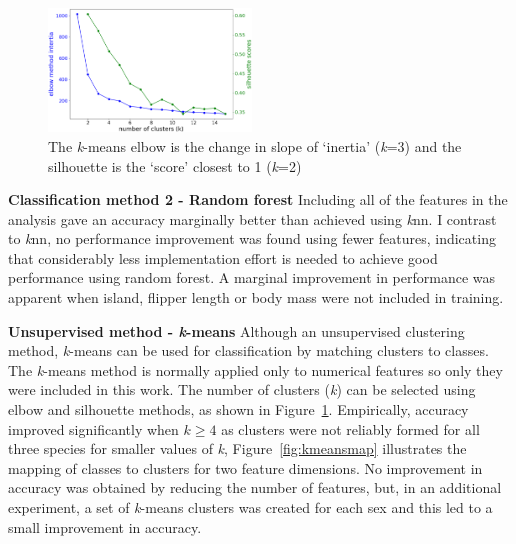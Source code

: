 \documentclass[12pt]{article}
\begin{document}
\begin{figure} %
  \centering
  \vspace{-2\baselineskip} %
  \includegraphics[width=0.48\textwidth]{kmeansvalue.png} %
  \vspace{-1.5\baselineskip} %
  \caption{The \textit{k}-means elbow is the change in slope of `inertia' (\textit{k}=3)
  and the silhouette is the `score' closest to 1 (\textit{k}=2)}
  \vspace{-0.5\baselineskip} %
  \label{fig:kmeansvalue}
\end{figure}

\textbf{Classification method 2 - Random forest}  
Including all of the features in the analysis gave an accuracy marginally better 
than achieved using \textit{k}nn. 
I contrast to \textit{k}nn, no performance improvement was found using fewer features, indicating that 
considerably less implementation effort is needed to achieve good performance using random forest. 
A marginal improvement in performance was apparent when island, flipper length or body mass were not included in training.

\textbf{Unsupervised method - \textit{k}-means}  
Although an unsupervised clustering method, 
\textit{k}-means can be used for classification by matching clusters to classes. 
The \textit{k}-means method is normally applied only to numerical features so only they were included in this work. 
The number of clusters (\textit{k}) can be selected using elbow and silhouette methods, 
as shown in Figure~\ref{fig:kmeansvalue}. Empirically, accuracy improved significantly when \(k \geq 4\)
as clusters were not reliably formed for all three species for smaller values of \textit{k},  
Figure~\ref{fig:kmeansmap} illustrates the mapping of classes to clusters for two feature dimensions. 
No improvement in accuracy was obtained by reducing the number of features, 
but, in an additional experiment, a set of \textit{k}-means clusters was created for each sex 
and this led to a small improvement in accuracy. 
\end{document}
